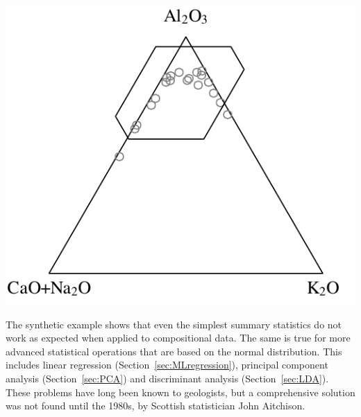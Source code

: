 \noindent\begin{minipage}[t][][b]{.4\textwidth}
\includegraphics[width=\textwidth]{../figures/ACNKnaive.pdf}\medskip
\end{minipage}
\begin{minipage}[t][][t]{.6\textwidth}
  \label{fig:ACNKnaive}
\end{minipage}

The synthetic example shows that even the simplest summary statistics
do not work as expected when applied to compositional data.  The same
is true for more advanced statistical operations that are based on the
normal distribution. This includes linear regression
(Section~\ref{sec:MLregression}), principal component analysis
(Section~\ref{sec:PCA}) and discriminant analysis
(Section~\ref{sec:LDA}). These problems have long been known to
geologists, but a comprehensive solution was not found until the
1980s, by Scottish statistician John Aitchison.\medskip

